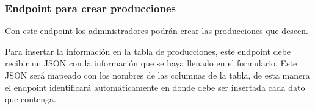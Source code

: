 \subsubsection{Endpoint para crear producciones}
Con este endpoint los administradores podrán crear las producciones que deseen.

Para insertar la información en la tabla de producciones, este endpoint debe recibir un JSON con la información que se haya llenado en el formulario. Este JSON será mapeado con los nombres de las columnas de la tabla, de esta manera el endpoint identificará automáticamente en donde debe ser insertada cada dato que contenga.